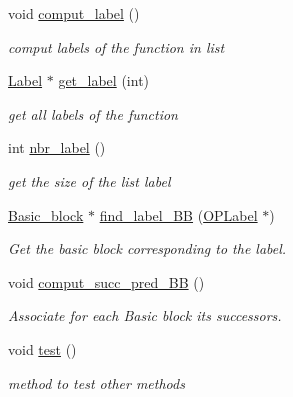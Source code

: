 \begin{DoxyCompactItemize}
\item 
\hypertarget{classFunction_a1c8830219ce4306c22a933b17f54cc6f}{void \hyperlink{classFunction_a1c8830219ce4306c22a933b17f54cc6f}{comput\-\_\-label} ()}\label{classFunction_a1c8830219ce4306c22a933b17f54cc6f}

\begin{DoxyCompactList}\small\item\em comput labels of the function in list \end{DoxyCompactList}\item 
\hypertarget{classFunction_a4b2e9837c4b506b3c7a6d1488d9914d1}{\hyperlink{classLabel}{\-Label} $\ast$ \hyperlink{classFunction_a4b2e9837c4b506b3c7a6d1488d9914d1}{get\-\_\-label} (int)}\label{classFunction_a4b2e9837c4b506b3c7a6d1488d9914d1}

\begin{DoxyCompactList}\small\item\em get all labels of the function \end{DoxyCompactList}\item 
\hypertarget{classFunction_a3f3807e12e695ffe23e1ef44edcd262b}{int \hyperlink{classFunction_a3f3807e12e695ffe23e1ef44edcd262b}{nbr\-\_\-label} ()}\label{classFunction_a3f3807e12e695ffe23e1ef44edcd262b}

\begin{DoxyCompactList}\small\item\em get the size of the list label \end{DoxyCompactList}\item 
\hypertarget{classFunction_ae55c0232d0eced8830daf57293229db8}{\hyperlink{classBasic__block}{\-Basic\-\_\-block} $\ast$ \hyperlink{classFunction_ae55c0232d0eced8830daf57293229db8}{find\-\_\-label\-\_\-\-B\-B} (\hyperlink{classOPLabel}{\-O\-P\-Label} $\ast$)}\label{classFunction_ae55c0232d0eced8830daf57293229db8}

\begin{DoxyCompactList}\small\item\em \-Get the basic block corresponding to the label. \end{DoxyCompactList}\item 
\hypertarget{classFunction_a3c52c8cb82e0137f02771331018b655c}{void \hyperlink{classFunction_a3c52c8cb82e0137f02771331018b655c}{comput\-\_\-succ\-\_\-pred\-\_\-\-B\-B} ()}\label{classFunction_a3c52c8cb82e0137f02771331018b655c}

\begin{DoxyCompactList}\small\item\em \-Associate for each \-Basic block its successors. \end{DoxyCompactList}\item 
\hypertarget{classFunction_aaa0d06640a5075c416106a88bd9a833a}{void \hyperlink{classFunction_aaa0d06640a5075c416106a88bd9a833a}{test} ()}\label{classFunction_aaa0d06640a5075c416106a88bd9a833a}

\begin{DoxyCompactList}\small\item\em method to test other methods \end{DoxyCompactList}\end{DoxyCompactItemize}


